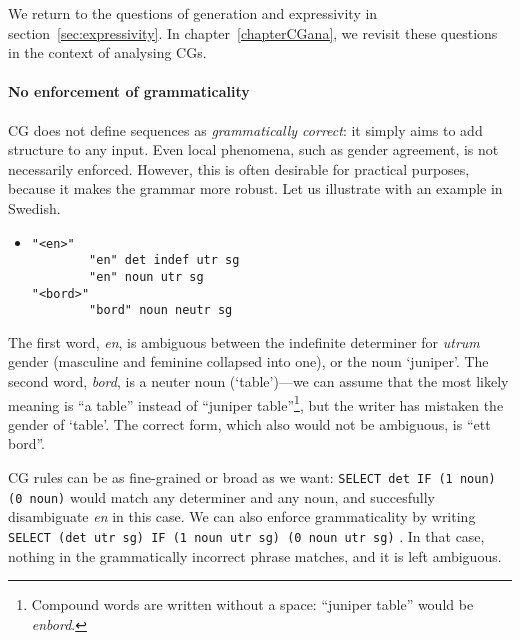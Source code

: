 We return to the questions of generation and expressivity in section~\ref{sec:expressivity}. 
In chapter~\ref{chapterCGana}, we revisit these questions in the context of analysing CGs.

 
\paragraph{No enforcement of grammaticality} 




CG does not define sequences as \emph{grammatically correct}: it simply aims to add structure to any input.
Even local phenomena, such as gender agreement, is not necessarily enforced.
However, this is often desirable for practical purposes, because it makes the grammar more robust.
Let us illustrate with an example in Swedish.

\begin{itemize}
\item[] \begin{verbatim}
"<en>"
        "en" det indef utr sg
        "en" noun utr sg 
"<bord>"
        "bord" noun neutr sg
\end{verbatim}
\end{itemize}

The first word, \emph{en}, is ambiguous between the indefinite determiner for
\emph{utrum} gender  (masculine and feminine collapsed into one), or the noun `juniper'.
The second word, \emph{bord}, is a neuter noun (`table')---we can assume that the
most likely meaning is ``a table'' instead of ``juniper table''\footnote{Compound words are written without a space: ``juniper table'' would be \emph{enbord}.}, but the writer has mistaken the gender of `table'. The correct form, which also would not be ambiguous, is ``ett bord''.

CG rules can be as fine-grained or broad as we want: 
\texttt{SELECT det IF (1 noun) (0 noun)} would match any determiner and any noun, 
and succesfully disambiguate \emph{en} in this case. 
We can also enforce grammaticality by writing \texttt{SELECT (det~utr~sg) IF (1~noun~utr~sg) (0~noun~utr~sg)}%
. In that case, nothing in the grammatically incorrect phrase matches, and it is left ambiguous.


